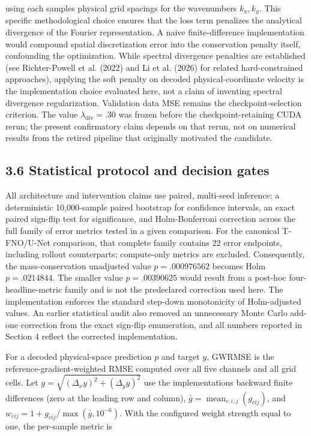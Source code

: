 \documentclass[preprint,12pt]{elsarticle}
\begin{document}
using each sample\textquotesingle s physical grid spacings for the
wavenumbers \(k_x, k_y\). This specific methodological choice ensures
that the loss term penalizes the analytical divergence of the Fourier
representation. A naive finite-difference implementation would compound
spatial discretization error into the conservation penalty itself,
confounding the optimization. While spectral divergence penalties are
established (see Richter-Powell et al. (2022)\cite{richterpowell2022neural} and Li et al. (2026)\cite{li2026project} for
related hard-constrained approaches), applying the soft penalty on
decoded physical-coordinate velocity is the implementation choice
evaluated here, not a claim of inventing spectral divergence
regularization. Validation data MSE remains the checkpoint-selection
criterion. The value \(\lambda_{\text{div}}=.30\) was frozen before the
checkpoint-retaining CUDA rerun; the present confirmatory claim depends
on that rerun, not on numerical results from the retired pipeline that
originally motivated the candidate.

\subsection*{3.6 Statistical protocol and decision
gates}\label{36-statistical-protocol-and-decision-gates}

All architecture and intervention claims use paired, multi-seed
inference: a deterministic 10,000-sample paired bootstrap for confidence
intervals, an exact paired sign-flip test for significance, and
Holm-Bonferroni correction across the full family of error metrics
tested in a given comparison. For the canonical T-FNO/U-Net comparison,
that complete family contains 22 error endpoints, including rollout
counterparts; compute-only metrics are excluded. Consequently, the
mass-conservation unadjusted value \(p=.000976562\) becomes Holm
\(p=.0214844\). The smaller value \(p=.00390625\) would result from a
post-hoc four-headline-metric family and is not the predeclared
correction used here. The implementation enforces the standard step-down
monotonicity of Holm-adjusted values. An earlier statistical audit also
removed an unnecessary Monte Carlo add-one correction from the exact
sign-flip enumeration, and all numbers reported in Section 4 reflect the
corrected implementation.

For a decoded physical-space prediction \(p\) and target \(y\), GWRMSE
is the reference-gradient-weighted RMSE computed over all five channels
and all grid cells. Let \(g=\sqrt{(\Delta_x y)^2+(\Delta_y y)^2}\) use
the implementation\textquotesingle s backward finite differences (zero
at the leading row and column),
\(\bar g=\operatorname{mean}_{c,i,j}(g_{cij})\), and
\(w_{cij}=1+g_{cij}/\max(\bar g,10^{-6})\). With the configured weight
strength equal to one, the per-sample metric is
\end{document}
